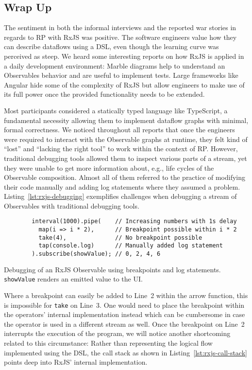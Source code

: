 \documentclass[12pt,a4paper]{article}
\begin{document}
\subsection{Wrap Up}

The sentiment in both the informal interviews and the reported war stories in regards to RP with RxJS was positive. The software engineers value how they can describe dataflows using a DSL, even though the learning curve was perceived as steep. We heard some interesting reports on how RxJS is applied in a daily development environment: Marble diagrams help to understand  an Observables behavior and are useful to implement tests. Large frameworks like Angular hide some of the complexity of RxJS but allow engineers to make use of its full power once the provided functionality needs to be extended.

Most participants considered a statically typed language like TypeScript, a fundamental necessity allowing them to implement dataflow graphs with minimal, formal correctness. We noticed throughout all reports that once the engineers were required to interact with the Observable graphs at runtime, they felt kind of ``lost'' and ``lacking the right tool'' to work within the context of RP. However, traditional debugging tools allowed them to inspect various parts of a stream, yet they were unable to get more information about, e.g., life cycles of the Observable composition. Almost all of them referred to the practice of modifying their code manually and adding log statements where they assumed a problem. Listing~\ref{lst:rxjs-debugging} exemplifies challenges when debugging a stream of Observables with traditional debugging tools.

\begin{listing}[H]
	\begin{verbatim}
		interval(1000).pipe(    // Increasing numbers with 1s delay
		  map(i => i * 2),      // Breakpoint possible within i * 2
		  take(4),              // No breakpoint possible
		  tap(console.log)      // Manually added log statement
		).subscribe(showValue); // 0, 2, 4, 6
	\end{verbatim}
	\caption{Debugging of an RxJS Observable using breakpoints and log statements. \texttt{showValue} renders an emitted value to the UI.}
	\label{lst:rxjs-debugging}
\end{listing}

Where a breakpoint can easily be added to Line~2 within the arrow function, this is impossible for \texttt{take} on Line~3. One would need to place the breakpoint within the operators' internal implementation instead which can be cumbersome in case the operator is used in a different stream as well. Once the breakpoint on Line~2 interrupts the execution of the program, we will notice another shortcoming related to this circumstance: Rather than representing the logical flow implemented using the DSL, the call stack as shown in Listing~\ref{lst:rxjs-call-stack} points deep into RxJS' internal implementation.
\end{document}
